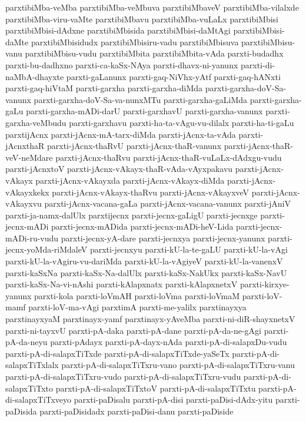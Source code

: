{parxtibiMba-veMba
parxtibiMba-veMbuva
parxtibiMbaveV
parxtibiMba-vilalxde
parxtibiMba-viru-vaMte
parxtibiMbavu
parxtibiMba-vuLaLx
parxtibiMbisi
parxtibiMbisi-dAdxne
parxtibiMbisida
parxtibiMbisi-daMtAgi
parxtibiMbisi-daMte
parxtibiMbisidudx
parxtibiMbisiru-vadu
parxtibiMbisuva
parxtibiMbisu-vanu
parxtibiMbisu-vudu
parxtibiMbita
parxtibiMbita-vAda
parxti-budadhx
parxti-bu-dadhxno
parxti-ca-kaSx-NAya
parxti-dhavx-ni-yanunx
parxti-di-naMbA-dhayxte
parxti-gaLanunx
parxti-gaq-NiVhx-yAtf
parxti-gaq-hANxti
parxti-gaq-hiVtaM
parxti-garxha
parxti-garxha-diMda
parxti-garxha-doV-Sa-vanunx
parxti-garxha-doV-Sa-va-nunxMTu
parxti-garxha-gaLiMda
parxti-garxha-gaLu
parxti-garxha-mADi-darU
parxti-garxhavU
parxti-garxha-vanunx
parxti-garxha-veMbudu
parxti-garxhavu
parxti-ha-ta-vAgu-vu-dilalx
parxti-ha-ti-gaLu
parxtijAcnx
parxti-jAcnx-mA-tarx-diMda
parxti-jAcnx-ta-vAda
parxti-jAcnxthaR
parxti-jAcnx-thaRvU
parxti-jAcnx-thaR-vanunx
parxti-jAcnx-thaR-veV-neMdare
parxti-jAcnx-thaRvu
parxti-jAcnx-thaR-vuLaLx-dAdxgu-vudu
parxti-jAcnxtoV
parxti-jAcnx-vAkayx-thaR-vAda-vAyxpakavu
parxti-jAcnx-vAkayx
parxti-jAcnx-vAkayxda
parxti-jAcnx-vAkayx-diMda
parxti-jAcnx-vAkayxkekx
parxti-jAcnx-vAkayx-thaRvu
parxti-jAcnx-vAkayxveV
parxti-jAcnx-vAkayxvu
parxti-jAcnx-vacana-gaLa
parxti-jAcnx-vacana-vanunx
parxti-jAniV
parxti-ja-namx-dalUlx
parxtijecnx
parxti-jecnx-gaLigU
parxti-jecnxge
parxti-jecnx-mADi
parxti-jecnx-mADida
parxti-jecnx-mADi-heV-Lida
parxti-jecnx-mADi-ru-vudu
parxti-jecnx-yA-dare
parxti-jecnxya
parxti-jecnx-yanunx
parxti-jecnx-yoMda-riMdaleV
parxti-jecnxyu
parxti-kU-la-te-gaLU
parxti-kU-la-vAgi
parxti-kU-la-vAgiru-vu-dariMda
parxti-kU-la-vAgiyeV
parxti-kU-la-vanenxV
parxti-kaSxNa
parxti-kaSx-Na-dalUlx
parxti-kaSx-NakUkx
parxti-kaSx-NavU
parxti-kaSx-Na-vi-nAshi
parxti-kAlapxnatx
parxti-kAlapxnetxV
parxti-kirxye-yanunx
parxti-kola
parxti-loVmAH
parxti-loVma
parxti-loVmaM
parxti-loV-mamf
parxti-loV-ma-vAgi
parxtimA
parxti-me-yalilx
parxtinayxya
parxtinayxyaM
parxtinayx-yamf
parxtinayx-yAveMba
parxti-ni-diR-shayxnetxV
parxti-ni-tayxvU
parxti-pA-daka
parxti-pA-dane
parxti-pA-da-ne-gAgi
parxti-pA-da-neyu
parxti-pAdayx
parxti-pA-dayx-nAda
parxti-pA-di-salapxDu-vudu
parxti-pA-di-salapxTiTxde
parxti-pA-di-salapxTiTxde-yaSeTx
parxti-pA-di-salapxTiTxlalx
parxti-pA-di-salapxTiTxru-vano
parxti-pA-di-salapxTiTxru-vanu
parxti-pA-di-salapxTiTxru-vudo
parxti-pA-di-salapxTiTxru-vudu
parxti-pA-di-salapxTiTxto
parxti-pA-di-salapxTiTxtoV
parxti-pA-di-salapxTiTxtu
parxti-pA-di-salapxTiTxveyo
parxti-paDisalu
parxti-pA-disi
parxti-paDisi-dAdx-yitu
parxti-paDisida
parxti-paDisidadx
parxti-paDisi-danu
parxti-paDiside
}
